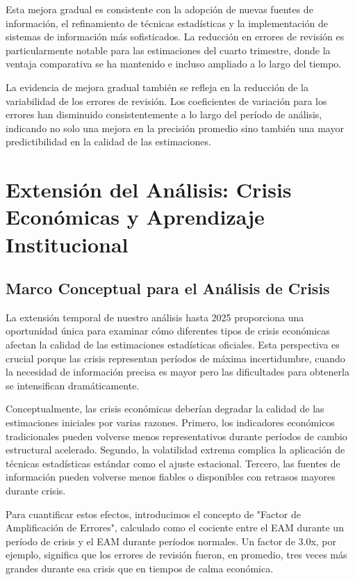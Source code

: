 \documentclass[12pt,a4paper]{article}
\begin{document}
Esta mejora gradual es consistente con la adopción de nuevas fuentes de información, el refinamiento de técnicas estadísticas y la implementación de sistemas de información más sofisticados. La reducción en errores de revisión es particularmente notable para las estimaciones del cuarto trimestre, donde la ventaja comparativa se ha mantenido e incluso ampliado a lo largo del tiempo.

La evidencia de mejora gradual también se refleja en la reducción de la variabilidad de los errores de revisión. Los coeficientes de variación para los errores han disminuido consistentemente a lo largo del período de análisis, indicando no solo una mejora en la precisión promedio sino también una mayor predictibilidad en la calidad de las estimaciones.

\section{Extensión del Análisis: Crisis Económicas y Aprendizaje Institucional}

\subsection{Marco Conceptual para el Análisis de Crisis}

La extensión temporal de nuestro análisis hasta 2025 proporciona una oportunidad única para examinar cómo diferentes tipos de crisis económicas afectan la calidad de las estimaciones estadísticas oficiales. Esta perspectiva es crucial porque las crisis representan períodos de máxima incertidumbre, cuando la necesidad de información precisa es mayor pero las dificultades para obtenerla se intensifican dramáticamente.

Conceptualmente, las crisis económicas deberían degradar la calidad de las estimaciones iniciales por varias razones. Primero, los indicadores económicos tradicionales pueden volverse menos representativos durante períodos de cambio estructural acelerado. Segundo, la volatilidad extrema complica la aplicación de técnicas estadísticas estándar como el ajuste estacional. Tercero, las fuentes de información pueden volverse menos fiables o disponibles con retrasos mayores durante crisis.

Para cuantificar estos efectos, introducimos el concepto de "Factor de Amplificación de Errores", calculado como el cociente entre el EAM durante un período de crisis y el EAM durante períodos normales. Un factor de 3.0x, por ejemplo, significa que los errores de revisión fueron, en promedio, tres veces más grandes durante esa crisis que en tiempos de calma económica.
\end{document}
